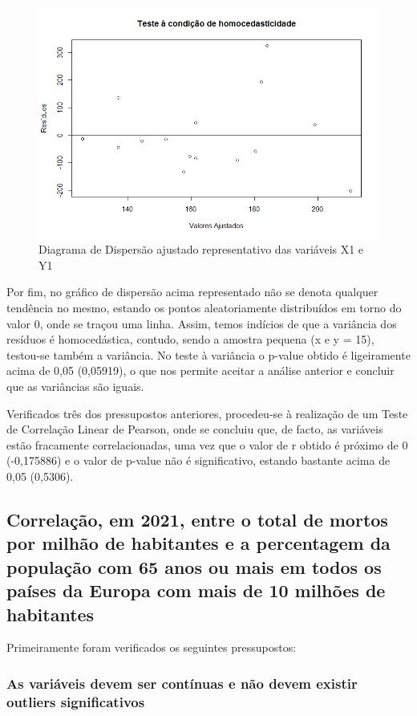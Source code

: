 \documentclass[conference]{IEEEtran}
\begin{document}
\begin{figure}[htbp]
\centerline{\includegraphics[width=0.95\columnwidth]{images/03.a.4.png}}
\caption{Diagrama de Dispersão ajustado representativo das variáveis X1 e Y1}
\label{fig}
\end{figure}

Por fim, no gráfico de dispersão acima representado não se denota qualquer tendência no mesmo, estando os pontos aleatoriamente distribuídos em torno do valor 0, onde se traçou uma linha. Assim, temos indícios de que a variância dos resíduos é homocedástica, contudo, sendo a amostra pequena (x e y = 15), testou-se também a variância. No teste à variância o p-value obtido é ligeiramente acima de 0,05 (0,05919), o que nos permite aceitar a análise anterior e concluir que as variâncias são iguais.

Verificados três dos pressupostos anteriores, procedeu-se à realização de um Teste de Correlação Linear de Pearson, onde se concluiu que, de facto, as variáveis estão fracamente correlacionadas, uma vez que o valor de r obtido é próximo de 0 (-0,175886) e o valor de p-value não é significativo, estando bastante acima de 0,05 (0,5306).

\subsection{Correlação, em 2021, entre o total de mortos por milhão de habitantes e a percentagem da população com 65 anos ou mais em todos os países da Europa com mais de 10 milhões de habitantes}

Primeiramente foram verificados os seguintes pressupostos:

\subsubsection{As variáveis devem ser contínuas e não devem existir outliers significativos}
\end{document}

